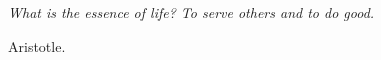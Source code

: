 \documentclass[a4paper, 11pt]{Thesis}  %
\begin{document}
 
 
 
 
 
 

\pagestyle{empty}  %

\null\vfill
\textit{What is the essence of life? To serve others and to do good.} 

\begin{flushright}
Aristotle.
\end{flushright}

\vfill\vfill\vfill\vfill\vfill\vfill\null
\clearpage  %


\clearpage  %
\end{document}
